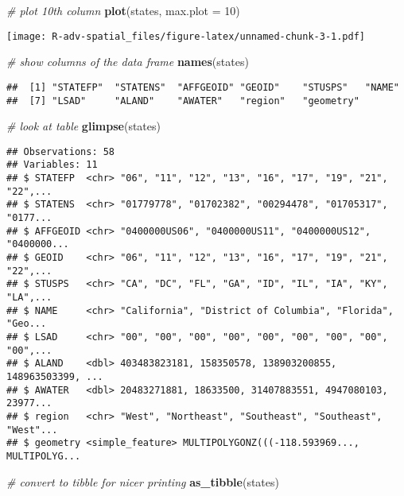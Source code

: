 \documentclass[]{book}
\newenvironment{Shaded}{\begin{snugshade}}{\end{snugshade}}
\newcommand{\KeywordTok}[1]{\textcolor[rgb]{0.13,0.29,0.53}{\textbf{{#1}}}}
\newcommand{\DataTypeTok}[1]{\textcolor[rgb]{0.13,0.29,0.53}{{#1}}}
\newcommand{\DecValTok}[1]{\textcolor[rgb]{0.00,0.00,0.81}{{#1}}}
\newcommand{\CommentTok}[1]{\textcolor[rgb]{0.56,0.35,0.01}{\textit{{#1}}}}
\newcommand{\NormalTok}[1]{{#1}}
\begin{document}
\begin{Shaded}
\begin{Highlighting}[]
\CommentTok{# plot 10th column}
\KeywordTok{plot}\NormalTok{(states, }\DataTypeTok{max.plot =} \DecValTok{10}\NormalTok{)}
\end{Highlighting}
\end{Shaded}

\texttt{[image: R-adv-spatial\_files/figure-latex/unnamed-chunk-3-1.pdf]}

\begin{Shaded}
\begin{Highlighting}[]
\CommentTok{# show columns of the data frame}
\KeywordTok{names}\NormalTok{(states)}
\end{Highlighting}
\end{Shaded}

\begin{verbatim}
##  [1] "STATEFP"  "STATENS"  "AFFGEOID" "GEOID"    "STUSPS"   "NAME"    
##  [7] "LSAD"     "ALAND"    "AWATER"   "region"   "geometry"
\end{verbatim}

\begin{Shaded}
\begin{Highlighting}[]
\CommentTok{# look at table}
\KeywordTok{glimpse}\NormalTok{(states)}
\end{Highlighting}
\end{Shaded}

\begin{verbatim}
## Observations: 58
## Variables: 11
## $ STATEFP  <chr> "06", "11", "12", "13", "16", "17", "19", "21", "22",...
## $ STATENS  <chr> "01779778", "01702382", "00294478", "01705317", "0177...
## $ AFFGEOID <chr> "0400000US06", "0400000US11", "0400000US12", "0400000...
## $ GEOID    <chr> "06", "11", "12", "13", "16", "17", "19", "21", "22",...
## $ STUSPS   <chr> "CA", "DC", "FL", "GA", "ID", "IL", "IA", "KY", "LA",...
## $ NAME     <chr> "California", "District of Columbia", "Florida", "Geo...
## $ LSAD     <chr> "00", "00", "00", "00", "00", "00", "00", "00", "00",...
## $ ALAND    <dbl> 403483823181, 158350578, 138903200855, 148963503399, ...
## $ AWATER   <dbl> 20483271881, 18633500, 31407883551, 4947080103, 23977...
## $ region   <chr> "West", "Northeast", "Southeast", "Southeast", "West"...
## $ geometry <simple_feature> MULTIPOLYGONZ(((-118.593969..., MULTIPOLYG...
\end{verbatim}

\begin{Shaded}
\begin{Highlighting}[]
\CommentTok{# convert to tibble for nicer printing}
\KeywordTok{as_tibble}\NormalTok{(states)}
\end{Highlighting}
\end{Shaded}
\end{document}
